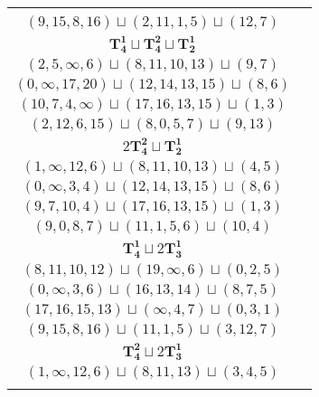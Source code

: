 \documentclass{article}
\begin{document}
\begin{longtable}{|c|c|}
\begin{tabular}{c}
        $(10,7,4,\infty)\sqcup(17,16,15,13)\sqcup(1,3)$ \\ 
        $(9,15,8,16)\sqcup(2,11,1,5)\sqcup(12,7)$
        \end{tabular} \\ 
        \hline
        $\mathbf{T_{4}^{1}} \sqcup \mathbf{T_{4}^{2}} \sqcup \mathbf{T_{2}^{1}}$ & \begin{tabular}{c}
        $(11,9,\infty,1)\sqcup(10,12,13,15)\sqcup(4,5)$ \\ 
        $(2,5,\infty,6)\sqcup(8,11,10,13)\sqcup(9,7)$ \\ 
        $(0,\infty,17,20)\sqcup(12,14,13,15)\sqcup(8,6)$ \\ 
        $(10,7,4,\infty)\sqcup(17,16,13,15)\sqcup(1,3)$ \\ 
        $(2,12,6,15)\sqcup(8,0,5,7)\sqcup(9,13)$
        \end{tabular} \\ 
        \hline
        $2\mathbf{T_{4}^{2}} \sqcup \mathbf{T_{2}^{1}}$ & \begin{tabular}{c}
        $(18,16,19,\infty)\sqcup(10,12,13,15)\sqcup(3,6)$ \\ 
        $(1,\infty,12,6)\sqcup(8,11,10,13)\sqcup(4,5)$ \\ 
        $(0,\infty,3,4)\sqcup(12,14,13,15)\sqcup(8,6)$ \\ 
        $(9,7,10,4)\sqcup(17,16,13,15)\sqcup(1,3)$ \\ 
        $(9,0,8,7)\sqcup(11,1,5,6)\sqcup(10,4)$
        \end{tabular} \\ 
        \hline
        $\mathbf{T_{4}^{1}} \sqcup 2\mathbf{T_{3}^{1}}$ & \begin{tabular}{c}
        $(11,13,12,15)\sqcup(9,\infty,1)\sqcup(2,4,5)$ \\ 
        $(8,11,10,12)\sqcup(19,\infty,6)\sqcup(0,2,5)$ \\ 
        $(0,\infty,3,6)\sqcup(16,13,14)\sqcup(8,7,5)$ \\ 
        $(17,16,15,13)\sqcup(\infty,4,7)\sqcup(0,3,1)$ \\ 
        $(9,15,8,16)\sqcup(11,1,5)\sqcup(3,12,7)$
        \end{tabular} \\ 
        \hline
        $\mathbf{T_{4}^{2}} \sqcup 2\mathbf{T_{3}^{1}}$ & \begin{tabular}{c}
        $(18,16,19,\infty)\sqcup(13,12,15)\sqcup(5,3,6)$ \\ 
        $(1,\infty,12,6)\sqcup(8,11,13)\sqcup(3,4,5)$ \\ 

\end{tabular}
\end{longtable}
\end{document}
